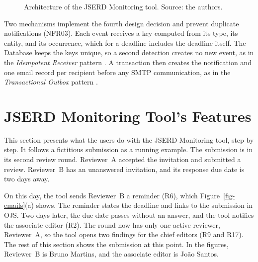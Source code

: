 \documentclass[12pt]{article}
\begin{document}
\begin{figure}[!t]
\endgroup
\caption{Architecture of the JSERD Monitoring tool. Source: the authors.}
\label{fig-architecture}
\end{figure}

Two mechanisms implement the fourth design decision and prevent duplicate
notifications (NFR03). Each event receives a key
computed from its type, its entity, and its occurrence, which for a deadline
includes the deadline itself. The Database keeps the keys unique, so a
second detection creates no new event, as in the \textit{Idempotent
Receiver} pattern \cite{idemreceiver}. A transaction then creates the notification and
one email record per recipient before any SMTP communication, as in the
\textit{Transactional Outbox} pattern \cite{outbox}.

\section{JSERD Monitoring Tool's Features}
\label{sec-features}

This section presents what the users do with the JSERD Monitoring tool, step by
step. It follows a fictitious submission as a running example. The submission is in its second review
round. Reviewer~A accepted the invitation and submitted a review. Reviewer~B
has an unanswered invitation, and its response due date is two days away.

On this day, the tool sends Reviewer~B a reminder (R6), which
Figure~\ref{fig-emails}(a) shows. The reminder states the deadline and links
to the submission in OJS. Two days later, the due date passes without an
answer, and the tool notifies the associate editor (R2). The round now has
only one active reviewer, Reviewer~A, so the tool opens two findings for the
chief editors (R9 and R17). The rest of this section shows the submission at this point. In
the figures, Reviewer~B is Bruno Martins, and the associate editor is João
Santos.
\end{document}
